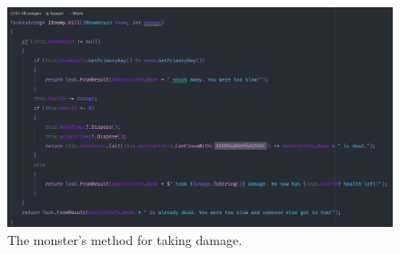 \begin{figure}
	\centering
	\includegraphics[width=\linewidth]{Materials/Decomposition/Boss/MonsterKill}
	\caption{The monster's method for taking damage.}
	\label{MonsterKill}
\end{figure}

\newpage

